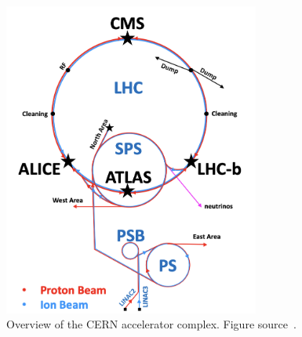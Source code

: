 \begin{figure}[t!]
\centering
\includegraphics[width=0.75\textwidth]{figures/acceleration_chain.png}
\caption[A diagram of the CERN accelerator chain]{Overview of the CERN accelerator complex. Figure source~\cite{acceleration_complex}.}
\label{fig:acceleration_complex}
\end{figure}
